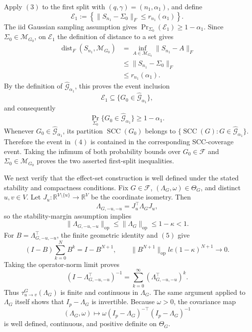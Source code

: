 Apply \((3)\) to the first split with \((q,\gamma)=(n_1,\alpha_1)\), and define
\[
 \mathcal E_1
 :=\left\{\|S_{n_1}-\Sigma_0\|_F\le r_{n_1}(\alpha_1)\right\}.
\]
The iid Gaussian sampling assumption gives
\(\Pr_{\Sigma_0}(\mathcal E_1)\ge1-\alpha_1\).  Since
\(\Sigma_0\in\mathcal M_{G_0}\), on \(\mathcal E_1\) the definition of distance to a set gives
\[
\begin{aligned}
 \operatorname{dist}_F(S_{n_1},\mathcal M_{G_0})
 &=\inf_{A\in\mathcal M_{G_0}}\|S_{n_1}-A\|_F\\
 &\le \|S_{n_1}-\Sigma_0\|_F\\
 &\le r_{n_1}(\alpha_1).
\end{aligned}
\]
By the definition of \(\widehat{\mathcal G}_{\alpha_1}\), this proves the event inclusion
\[
 \mathcal E_1\subseteq\{G_0\in\widehat{\mathcal G}_{\alpha_1}\},
\]
and consequently
\[
 \Pr_{\Sigma_0}\{G_0\in\widehat{\mathcal G}_{\alpha_1}\}
 \ge1-\alpha_1.
\tag{4}
\]
Whenever \(G_0\in\widehat{\mathcal G}_{\alpha_1}\), its partition \(\operatorname{SCC}(G_0)\) belongs to
\(\{\operatorname{SCC}(G):G\in\widehat{\mathcal G}_{\alpha_1}\}\).  Therefore the event in \((4)\) is contained in the corresponding SCC-coverage event.  Taking the infimum of both probability bounds over \(G_0\in\mathcal F\) and \(\Sigma_0\in\mathcal M_{G_0}\) proves the two asserted first-split inequalities.

We next verify that the effect-set construction is well defined under the stated stability and compactness conditions.  Fix \(G\in\mathcal F\), \((\Lambda_G,\omega)\in\Theta_G\), and distinct \(u,v\in V\).  Let \(J_u:\mathbb R^{V\setminus\{u\}}\to\mathbb R^V\) be the coordinate isometry.  Then
\[
 \Lambda_{G,-u,-u}=J_u^\top\Lambda_GJ_u,
\]
so the stability-margin assumption implies
\[
 \|\Lambda_{G,-u,-u}\|_{\mathrm{op}}
 \le\|\Lambda_G\|_{\mathrm{op}}
 \le1-\kappa<1.
\tag{5}
\]
For \(B=\Lambda_{G,-u,-u}^\top\), the finite geometric identity and \((5)\) give
\[
 (I-B)\sum_{k=0}^N B^k=I-B^{N+1},
 \qquad
 \|B^{N+1}\|_{\mathrm{op}}le(1-\kappa)^{N+1}\longrightarrow0.
\]
Taking the operator-norm limit proves
\[
 (I-\Lambda_{G,-u,-u}^\top)^{-1}
 =\sum_{k=0}^{\infty}(\Lambda_{G,-u,-u}^\top)^k.
\tag{6}
\]
Thus \(\tau_{u\to v}^G(\Lambda_G)\) is finite and continuous in \(\Lambda_G\).  The same argument applied to \(\Lambda_G\) itself shows that \(I_p-\Lambda_G\) is invertible.  Because \(\omega>0\), the covariance map
\[
 (\Lambda_G,\omega)\longmapsto
 \omega(I_p-\Lambda_G)^{-\top}(I_p-\Lambda_G)^{-1}
\]
is well defined, continuous, and positive definite on \(\Theta_G\).

